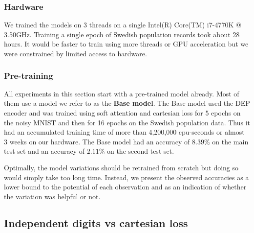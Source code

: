 \subsubsection{Hardware}
We trained the models on 3 threads on a single Intel(R) Core(TM) i7-4770K @ 3.50GHz. Training a single epoch of Swedish population records took about 28 hours. It would be faster to train using more threads or GPU acceleration but we were constrained by limited access to hardware.


\subsubsection{Pre-training}

All experiments in this section start with a pre-trained model already. Most of them use a model we refer to as the \textbf{Base model}. The Base model used the DEP encoder and was trained using soft attention and cartesian loss for 5 epochs on the noisy MNIST and then for 16 epochs on the Swedish population data. Thus it had an accumulated training time of more than 4,200,000 cpu-seconds or almost 3 weeks on our hardware.
The Base model had an accuracy of $8.39\%$ on the main test set and an accuracy of $2.11\%$ on the second test set.

Optimally, the model variations should be retrained from scratch but doing so would simply take too long time.
Instead, we present the observed accuracies as a lower bound to the potential of each observation and as an indication of whether the variation was helpful or not.




\subsection{Independent digits vs cartesian loss} \label{sssec:ind_digits}

